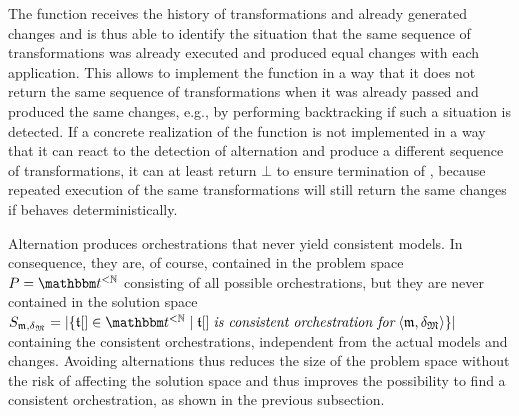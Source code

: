 The  function receives the history of transformations and already generated changes and is thus able to identify the situation that the same sequence of transformations was already executed and produced equal changes with each application.
This allows to implement the function in a way that it does not return the same sequence of transformations when it was already passed and produced the same changes, e.g., by performing backtracking if such a situation is detected.
If a concrete realization of the  function is not implemented in a way that it can react to the detection of alternation and produce a different sequence of transformations, it can at least return $\bot$ to ensure termination of , because repeated execution of the same transformations will still return the same changes if  behaves deterministically.

Alternation produces orchestrations that never yield consistent models.
In consequence, they are, of course, contained in the problem space $P = {\transformationset{T}^{< \mathbb{N}}}$ consisting of all possible orchestrations, but they are never contained in the solution space $S_{\modeltuple{m}, \changetuple{\metamodeltuple{M}}} = \abs{\setted{\sequence{\transformation{t}} \in \transformationset{T}^{< \mathbb{N}} \mid \sequence{\transformation{t}} \mathtextspacearound{is consistent orchestration for} \tupled{\modeltuple{m}, \changetuple{\metamodeltuple{M}}}}}$ containing the consistent orchestrations, independent from the actual models and changes.
Avoiding alternations thus reduces the size of the problem space without the risk of affecting the solution space and thus improves the possibility to find a consistent orchestration, as shown in the previous subsection.

